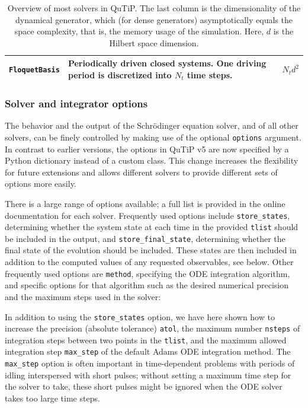 \documentclass[preprint,3p,sort&compress]{elsarticle}
\def\code#1{\texttt{#1}}
\begin{document}
\begin{table}[t!]
\begin{tabular}{@{}lp{10cm}c@{}}
        \code{FloquetBasis} & Periodically driven closed systems. One driving period is discretized into $N_t$ time steps. & $N_t d^2$ \\
\bottomrule
    \end{tabular}
    \caption{Overview of most solvers in QuTiP. The last column is the dimensionality of the dynamical generator, which (for dense generators) asymptotically equals the space complexity, that is, the memory usage of the simulation. Here, $d$ is the Hilbert space dimension.}
    \label{tab:qutip_solvers}
\end{table}
\subsubsection{Solver and integrator options}
The behavior and the output of the Schrödinger equation solver, and of all other solvers, can be finely controlled by making use of the optional \code{options} argument. In contrast to earlier versions, the options in QuTiP v5 are now specified by a Python dictionary instead of a custom class. This change increases the flexibility for future extensions and allows different solvers to provide different sets of options more easily.

There is a large range of options available; a full list is provided in the online documentation for each solver.
Frequently used options include \code{store\_states}, determining whether the system state at each time in the provided \code{tlist} should be included in the output, and \code{store\_final\_state}, determining whether the final state of the evolution should be included. These states are then included in addition to the computed values of any requested observables, see below. Other frequently used options are \code{method}, specifying the ODE integration algorithm, and specific options for that algorithm such as the desired numerical precision and the maximum steps used in the solver:
\newpage
{}

In addition to using the \code{store\_states} option, we have here shown how to increase the precision (absolute tolerance) \code{atol}, the maximum number \code{nsteps} of integration steps between two points in the \code{tlist}, and the maximum allowed integration step \code{max\_step} of the default Adams ODE integration method. The \code{max\_step} option is often important in time-dependent problems with periods of idling interspersed with short pulses; without setting a maximum time step for the solver to take, these short pulses might be ignored when the ODE solver takes too large time steps.
\end{document}
